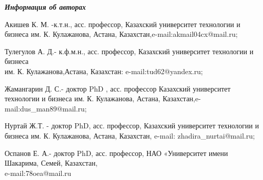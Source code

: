 \emph{{\bfseries Информация об авторах}}

\begin{noparindent}
Акишев К. М. -к.т.н., асс. профессор, Казахский университет технологии и
бизнеса им. К. Кулажанова, Астана, Казахстан,e-mail:akmail04cx@mail.ru;

Тулегулов А. Д.- к.ф.м.н., асс. профессор, Казахский университет
технологии и бизнеса \\им. К. Кулажанова,Астана, Казахстан:
e-mail:tud62@yandex.ru;

Жамангарин Д. С.- доктор PhD , асс. профессор Казахский университет
технологии и бизнеса им. К. Кулажанова, Астана,
Казахстан,e-mail:dus\_man89@mail.ru;

Нуртай Ж.Т. - доктор PhD, асс. профессор, Казахский университет
технологии и бизнеса им. К. Кулажанова, Астана, Казахстан, e-mail: zhadira\_nurtai@mail.ru;

Оспанов Е. А.- доктор PhD, асс. профессор, НАО «Университет имени
Шакарима, Семей, Казахстан, \\e-mail:78oea@mail.ru
\end{noparindent}
